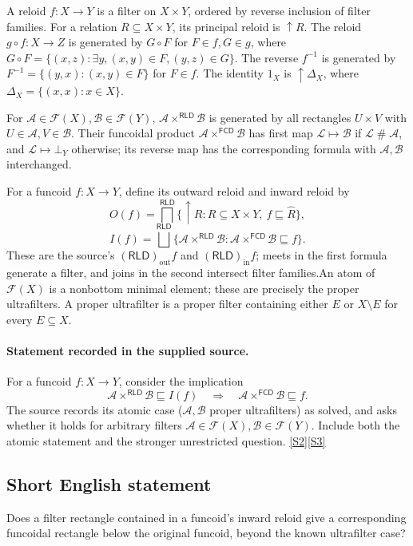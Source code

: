 \documentclass[11pt]{article}
\newcommand{\sref}[2]{\hyperlink{source:#1:#2}{[S#2]}}
\begin{document}
A reloid $f:X\to Y$ is a filter on $X\times Y$, ordered by reverse inclusion of filter families. For a relation $R\subseteq X\times Y$, its principal reloid is $\uparrow R$. The reloid $g\circ f:X\to Z$ is generated by $G\circ F$ for $F\in f,G\in g$, where $G\circ F=\{(x,z):\exists y,(x,y)\in F,(y,z)\in G\}$. The reverse $f^{-1}$ is generated by $F^{-1}=\{(y,x):(x,y)\in F\}$ for $F\in f$. The identity $1_X$ is $\uparrow\Delta_X$, where $\Delta_X=\{(x,x):x\in X\}$.

For $\mathcal A\in\mathcal F(X),\mathcal B\in\mathcal F(Y)$, $\mathcal A\times^{\mathsf{RLD}}\mathcal B$ is generated by all rectangles $U\times V$ with $U\in\mathcal A,V\in\mathcal B$. Their funcoidal product $\mathcal A\times^{\mathsf{FCD}}\mathcal B$ has first map $\mathcal L\mapsto\mathcal B$ if $\mathcal L\mathrel{\#}\mathcal A$, and $\mathcal L\mapsto\bot_Y$ otherwise; its reverse map has the corresponding formula with $\mathcal A,\mathcal B$ interchanged.

For a funcoid $f:X\to Y$, define its outward reloid and inward reloid by
\[
 O(f)=\bigsqcap^{\mathsf{RLD}}\{\uparrow R:R\subseteq X\times Y,\ f\sqsubseteq\widehat R\},
\]
\[
 I(f)=\bigsqcup^{\mathsf{RLD}}\{\mathcal A\times^{\mathsf{RLD}}\mathcal B:
       \mathcal A\times^{\mathsf{FCD}}\mathcal B\sqsubseteq f\}.
\]
These are the source's $(\mathsf{RLD})_{\mathrm{out}}f$ and $(\mathsf{RLD})_{\mathrm{in}}f$; meets in the first formula generate a filter, and joins in the second intersect filter families.An atom of $\mathcal F(X)$ is a nonbottom minimal element; these are precisely the proper ultrafilters. A proper ultrafilter is a proper filter containing either $E$ or $X\setminus E$ for every $E\subseteq X$.
\paragraph{Statement recorded in the supplied source.}
For a funcoid $f:X\to Y$, consider the implication
\[
 \mathcal A\times^{\mathsf{RLD}}\mathcal B\sqsubseteq I(f)
 \quad\Longrightarrow\quad
 \mathcal A\times^{\mathsf{FCD}}\mathcal B\sqsubseteq f.
\]
The source records its atomic case ($\mathcal A,\mathcal B$ proper ultrafilters) as solved, and asks whether it holds for arbitrary filters $\mathcal A\in\mathcal F(X),\mathcal B\in\mathcal F(Y)$. Include both the atomic statement and the stronger unrestricted question. \sref{3426}{2}\sref{3426}{3}
\subsection{Short English statement}
Does a filter rectangle contained in a funcoid’s inward reloid give a corresponding funcoidal rectangle below the original funcoid, beyond the known ultrafilter case?
\end{document}
